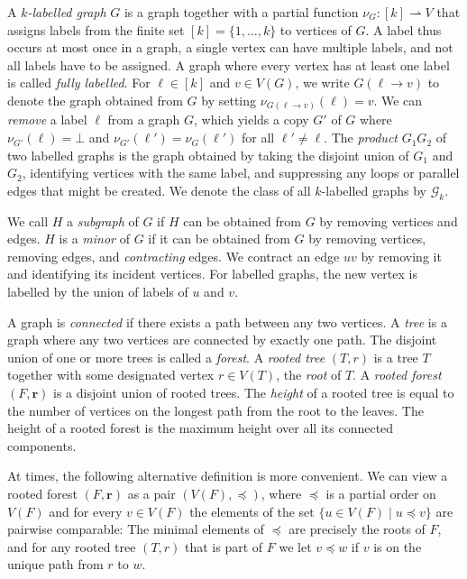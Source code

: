 \documentclass[10pt,a4paper]{article}
\newcommand{\CG}{\ensuremath{\mathcal G}}
\newcommand{\parto}{\ensuremath{\rightharpoonup}}
\newcommand{\tup}[1]{\ensuremath{\boldsymbol{#1}}}
\begin{document}
A \emph{$k$-labelled graph} $G$ is a graph together with a partial function $\nu_G \colon [k] \parto V$ that assigns labels from the finite set $[k] = \{1, \dots, k\}$ to vertices of $G$. A label thus occurs at most once in a graph, a single vertex can have multiple labels, and not all labels have to be assigned. A graph where every vertex has at least one label is called \emph{fully labelled}.
For $\ell \in [k]$ and $v \in V(G)$, we write $G(\ell \to v)$ to denote the graph obtained from $G$ by setting $\nu_{G(\ell \to v)}(\ell) = v$. We can \emph{remove} a label $\ell$ from a graph $G$, which yields a copy $G'$ of $G$ where $\nu_{G'}(\ell) = \bot$ and $\nu_{G'}(\ell') = \nu_{G}(\ell')$ for all $\ell' \neq \ell$. The \emph{product} $G_1G_2$ of two labelled graphs is the graph obtained by taking the disjoint union of $G_1$ and $G_2$, identifying vertices with the same label, and suppressing any loops or parallel edges that might be created.
We denote the class of all $k$-labelled graphs by $\CG_k$.

We call $H$ a \emph{subgraph} of $G$ if $H$ can be obtained from $G$ by removing vertices and edges. $H$ is a \emph{minor} of $G$ if it can be obtained from $G$ by removing vertices, removing edges, and \emph{contracting} edges. We contract an edge $uv$ by removing it and identifying its incident vertices. For labelled graphs, the new vertex is labelled by the union of labels of $u$ and $v$.

A graph is \emph{connected} if there exists a path between any two vertices. A \emph{tree} is a graph where any two vertices are connected by exactly one path. The disjoint union of one or more trees is called a \emph{forest}. A \emph{rooted tree} $(T, r)$ is a tree $T$ together with some designated vertex $r \in V(T)$, the \emph{root} of $T$. A \emph{rooted forest} $(F, \tup{r})$ is a disjoint union of rooted trees. The \emph{height} of a rooted tree is equal to the number of vertices on the longest path from the root to the leaves. The height of a rooted forest is the maximum height over all its connected components.

At times, the following alternative definition is more convenient. We can view a rooted forest $(F, \tup{r})$ as a pair $(V(F), \preceq)$, where $\preceq$ is a partial order on $V(F)$ and for every $v \in V(F)$ the elements of the set $\{u \in V(F) \mid u \preceq v\}$ are pairwise comparable: The minimal elements of $\preceq$ are precisely the roots of $F$, and for any rooted tree $(T, r)$ that is part of $F$ we let $v \preceq w$ if $v$ is on the unique path from $r$ to $w$.
\end{document}
